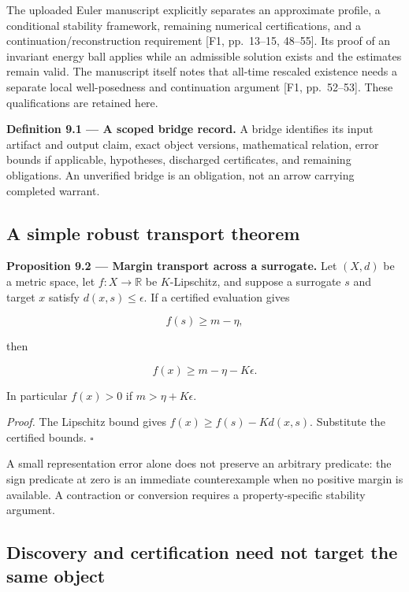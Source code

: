 \documentclass[11pt,a4paper]{article}
\begin{document}
The uploaded Euler manuscript explicitly separates an approximate
profile, a conditional stability framework, remaining numerical
certifications, and a continuation/reconstruction requirement {[}F1,
pp.~13--15, 48--55{]}. Its proof of an invariant energy ball applies
while an admissible solution exists and the estimates remain valid. The
manuscript itself notes that all-time rescaled existence needs a
separate local well-posedness and continuation argument {[}F1,
pp.~52--53{]}. These qualifications are retained here.


\textbf{Definition 9.1 --- A scoped bridge record.} A bridge identifies
its input artifact and output claim, exact object versions, mathematical
relation, error bounds if applicable, hypotheses, discharged
certificates, and remaining obligations. An unverified bridge is an
obligation, not an arrow carrying completed warrant.

\subsection{A simple robust transport
theorem}\label{a-simple-robust-transport-theorem}


\textbf{Proposition 9.2 --- Margin transport across a surrogate.} Let
\((X,d)\) be a metric space, let \(f:X\to\mathbb R\) be \(K\)-Lipschitz,
and suppose a surrogate \(s\) and target \(x\) satisfy
\(d(x,s)\leq\epsilon\). If a certified evaluation gives

\nopagebreak[4]

\[f(s)\geq m-\eta,\]

then

\nopagebreak[4]

\[f(x)\geq m-\eta-K\epsilon.\]

In particular \(f(x)>0\) if \(m>\eta+K\epsilon\).

\emph{Proof.} The Lipschitz bound gives \(f(x)\geq f(s)-Kd(x,s)\).
Substitute the certified bounds. \(\square\)

A small representation error alone does not preserve an arbitrary
predicate: the sign predicate at zero is an immediate counterexample
when no positive margin is available. A contraction or conversion
requires a property-specific stability argument.

\subsection{Discovery and certification need not target the same
object}\label{discovery-and-certification-need-not-target-the-same-object}
\end{document}

